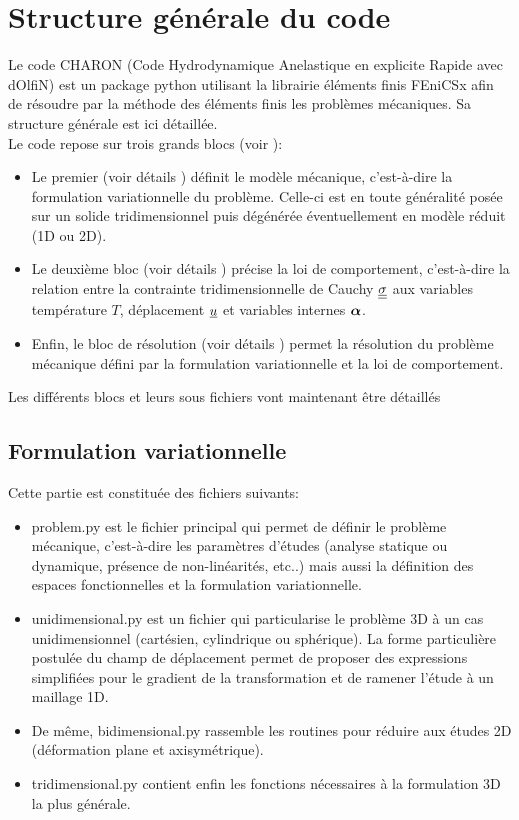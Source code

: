 \documentclass[10pt]{book}
\begin{document}
\section{Structure générale du code}
Le code CHARON (Code Hydrodynamique Anelastique en explicite Rapide avec dOlfiN) est un package python utilisant la librairie éléments finis FEniCSx afin de résoudre par la méthode des éléments finis les problèmes mécaniques. Sa structure générale est ici détaillée.\\

Le code repose sur trois grands blocs (voir ):
\begin{itemize}[label=$\dagger$]
\item Le premier (voir détails ) définit le modèle mécanique, c'est-à-dire la formulation variationnelle du problème. Celle-ci est en toute généralité posée sur un solide tridimensionnel puis dégénérée éventuellement en modèle réduit (1D ou 2D).
\item Le deuxième bloc (voir détails ) précise la loi de comportement, c'est-à-dire la relation entre la contrainte tridimensionnelle de Cauchy $\underline{\underline{\sigma}}$ aux variables température $T$, déplacement $\underline{u}$ et variables internes $\boldsymbol{\alpha}$.
\item Enfin, le bloc de résolution (voir détails ) permet la résolution du problème mécanique défini par la formulation variationnelle et la loi de comportement.
\end{itemize}
Les différents blocs et leurs sous fichiers vont maintenant être détaillés
\subsection{Formulation variationnelle}\label{Subsection:Charon Formulation variationnelle}
Cette partie est constituée des fichiers suivants:
\begin{itemize}
\item problem.py est le fichier principal qui permet de définir le problème mécanique, c'est-à-dire les paramètres d'études (analyse statique ou dynamique, présence de non-linéarités, etc..) mais aussi la définition des espaces fonctionnelles et la formulation variationnelle.
\item unidimensional.py est un fichier qui  particularise le problème 3D à un cas unidimensionnel (cartésien, cylindrique ou sphérique). La forme particulière postulée du champ de déplacement permet de proposer des expressions simplifiées pour le gradient de la transformation et de ramener l'étude à un maillage 1D.
\item De même, bidimensional.py rassemble les routines pour réduire aux études 2D (déformation plane et axisymétrique).
\item tridimensional.py contient enfin les fonctions nécessaires à la formulation 3D la plus générale.
\end{itemize}
\end{document}
